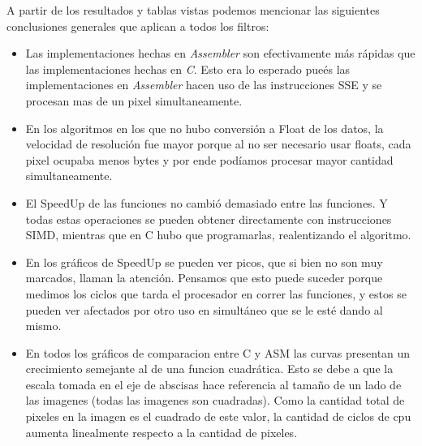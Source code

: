 A partir de los resultados y tablas vistas podemos mencionar las siguientes conclusiones generales que aplican a todos los filtros:
  \begin{itemize}
    \item Las implementaciones hechas en \textit{Assembler} son efectivamente m\'as r\'apidas que las implementaciones hechas en \textit{C}. Esto era lo esperado pue\'es las implementaciones en \textit{Assembler} hacen uso de las instrucciones SSE y se procesan mas de un pixel simultaneamente.
    \item En los algoritmos en los que no hubo conversi\'on a Float de los datos, la velocidad de resoluci\'on fue mayor porque al no ser necesario usar floats, cada pixel ocupaba menos bytes y por ende pod\'iamos procesar mayor cantidad simultaneamente. 
	\item El SpeedUp de las funciones no cambi\'o demasiado entre las funciones. 
	Y todas estas operaciones se pueden obtener directamente con instrucciones SIMD, mientras que en C hubo que programarlas, realentizando el algoritmo.
	\item En los gr\'aficos de SpeedUp se pueden ver picos, que si bien no son muy marcados, llaman	la atenci\'on. Pensamos que esto puede suceder porque medimos los ciclos que tarda el procesador en correr las funciones, y estos se pueden ver afectados por otro uso en simult\'aneo que se le est\'e dando al mismo. 
    \item En todos los gr\'aficos de comparacion entre C y ASM las curvas presentan un crecimiento semejante al de una funcion cuadr\'atica. Esto se debe a que la escala tomada en el eje de abscisas hace referencia al tama\~no de un lado de las imagenes (todas las imagenes son cuadradas). Como la cantidad total de pixeles en la imagen es el cuadrado de este valor, la cantidad de ciclos de cpu aumenta linealmente respecto a la cantidad de pixeles.
   \end{itemize}
  






